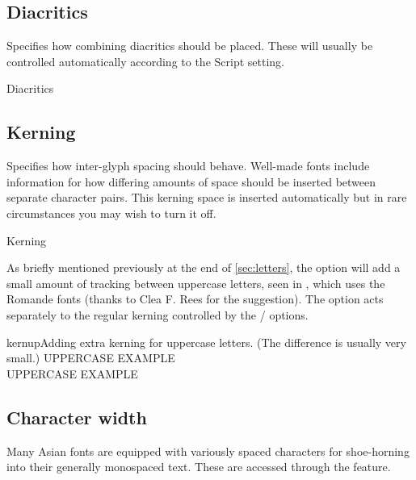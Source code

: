 \subsection{Diacritics}
Specifies how combining diacritics should be placed.
These will usually be controlled automatically
according to the Script setting.

\begin{features}{Diacritics}
\end{features}

\subsection{Kerning}\label{sec:kerning}
Specifies how inter-glyph spacing should behave.
Well-made fonts include information for how differing
amounts of space should be inserted between separate character pairs.
This kerning space is inserted automatically but in rare
circumstances you may wish to turn it off.

\begin{features}{Kerning}
\end{features}

As briefly mentioned previously at the end of \vref{sec:letters},
the  option will add a small amount of tracking between
uppercase letters, seen in , which uses the Romande
fonts
(thanks to Clea F. Rees for the suggestion).
The  option acts separately to the regular kerning
controlled by the / options.

\begin{Xexample}[firstline=2]{kernup}{Adding extra kerning for uppercase letters. (The difference is usually very small.)}
  \large
   UPPERCASE EXAMPLE \\
   UPPERCASE EXAMPLE
\end{Xexample}


\subsection{Character width}\label{sec:CharacterWidth}
Many Asian fonts are equipped with variously spaced characters for
shoe-horning into their generally monospaced text.
These are
accessed through the  feature.

